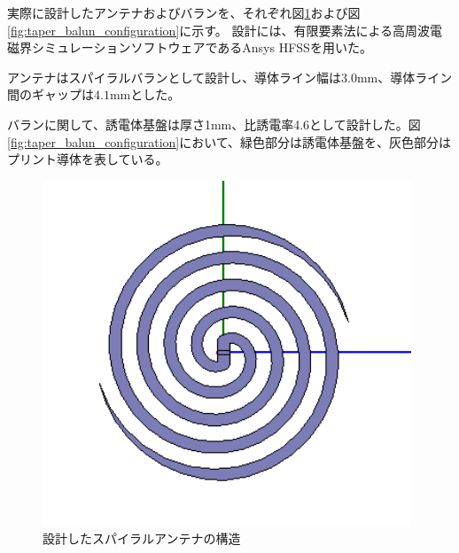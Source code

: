 \documentclass[11pt,a4paper,uplatex,draft]{ujarticle}
\begin{document}
  実際に設計したアンテナおよびバランを、それぞれ図\ref{fig:spiral_antenna_configuration}および図\ref{fig:taper_balun_configuration}に示す。
  設計には、有限要素法による高周波電磁界シミュレーションソフトウェアであるAnsys HFSSを用いた。

  アンテナはスパイラルバランとして設計し、導体ライン幅は$3.0\mathrm{mm}$、導体ライン間のギャップは$4.1\mathrm{mm}$とした。
  
  バランに関して、誘電体基盤は厚さ1mm、比誘電率4.6として設計した。図\ref{fig:taper_balun_configuration}において、緑色部分は誘電体基盤を、灰色部分は
  プリント導体を表している。

  \begin{figure}[hbtp]
    \centering
    \includegraphics[keepaspectratio, width=110mm]{Images/spiral_antenna_configuration.png}
    \caption{設計したスパイラルアンテナの構造}
    \label{fig:spiral_antenna_configuration}
  \end{figure}
\end{document}
